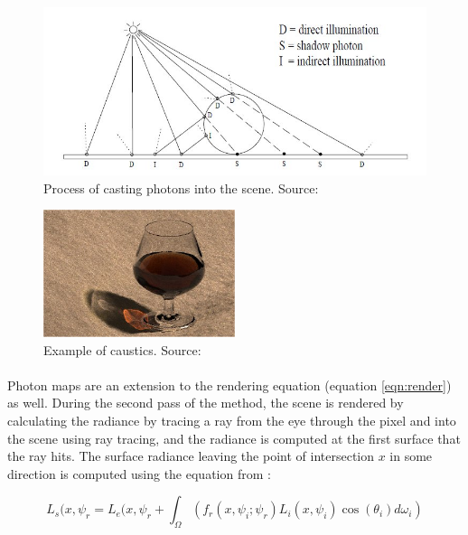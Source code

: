 \begin{figure}[h!]
  \centering
    \includegraphics[width=1.0\textwidth]{photonCalc.jpg}
  \caption{Process of casting photons into the scene. Source: \protect\cite{Jensen1996}}
	\label{fig:photonCalc}
\end{figure}

\begin{figure}[h!]
  \centering
    \includegraphics[width=0.5\textwidth]{photonCaustics.jpg}
  \caption{Example of caustics. Source: \protect\cite{Jensen1996}}
	\label{fig:photonCaustics}
\end{figure}

\paragraph{}
Photon maps are an extension to the rendering equation (equation \ref{eqn:render}) as well.  During the second pass of the method, the scene is rendered by calculating the radiance by tracing a ray from the eye through the pixel and into the scene using ray tracing, and the radiance is computed at the first surface that the ray hits.  The surface radiance leaving the point of intersection $x$ in some direction is computed using the equation from \cite{Jensen1996}:

\begin{equation}
L_{s}(x,\psi_{r} = L_{e}(x,\psi_{r} + \int_{\Omega}(f_{r}(x,\psi_{i};\psi_{r})L_{i}(x,\psi_{i})\cos(\theta_{i})d\omega_{i}) \label{eqn:photon1}
\end{equation}

